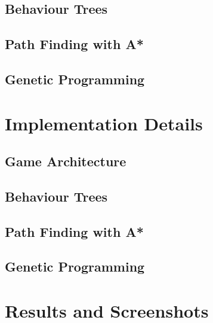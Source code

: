 \documentclass[a4paper, twocolumn]{article}
\begin{document}
        \subsection{Behaviour Trees} \label{sec:behaviour_trees}



        \subsection{Path Finding with A*} \label{sec:path_finding}



        \subsection{Genetic Programming} \label{sec:genetic_programming}



    \section{Implementation Details} \label{sec:implementation_details}



        \subsection{Game Architecture} \label{sec:game_architecture}



        \subsection{Behaviour Trees} \label{sec:behaviour_trees_implementation}



        \subsection{Path Finding with A*} \label{sec:path_finding_implementation}



        \subsection{Genetic Programming} \label{sec:genetic_programming_implementation}



    \section{Results and Screenshots} \label{sec:results_and_screenshots}
\end{document}
